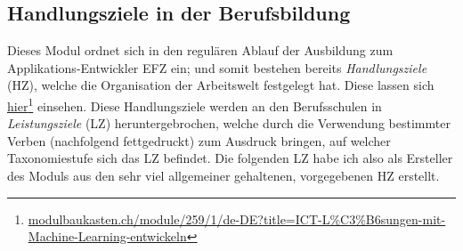 \documentclass[twocolumn]{article}
\begin{document}
\subsection{Handlungsziele in der Berufsbildung}
Dieses Modul ordnet sich in den regulären Ablauf der Ausbildung zum Applikations-Entwickler EFZ ein; und somit bestehen bereits \textit{Handlungsziele} (HZ), welche die Organisation der Arbeitswelt festgelegt hat. Diese lassen sich \href{https://www.modulbaukasten.ch/module/259/1/de-DE?title=ICT-L%C3%B6sungen-mit-Machine-Learning-entwickeln}{hier}\footnote{\url{modulbaukasten.ch/module/259/1/de-DE?title=ICT-L\%C3\%B6sungen-mit-Machine-Learning-entwickeln}} einsehen. Diese Handlungsziele werden an den Berufsschulen in \textit{Leistungsziele} (LZ) heruntergebrochen, welche durch die Verwendung bestimmter Verben (nachfolgend fettgedruckt) zum Ausdruck bringen, auf welcher Taxonomiestufe sich das LZ befindet. Die folgenden LZ habe ich also als Ersteller des Moduls aus den sehr viel allgemeiner gehaltenen, vorgegebenen HZ erstellt.
\end{document}
